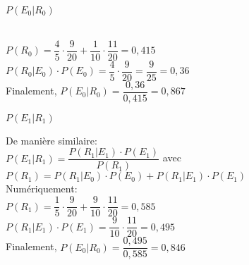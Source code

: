 \begin{exo}
\begin{subexo}{$P(E_0 | R_0)$}
\begin{flushleft}
      \\$P(R_0) = \dfrac{4}{5}\cdot\dfrac{9}{20} +\dfrac{1}{10}\cdot\dfrac{11}{20} = 0,415$
      \\$P(R_0|E_0)\cdot P(E_0) =  \dfrac{4}{5}\cdot \dfrac{9}{20} = \dfrac{9}{25} = 0,36$
      \\ Finalement, $P(E_0|R_0) = \dfrac{0,36}{0,415} = 0,867$
    \end{flushleft}
  \end{subexo}
  \begin{subexo}{$P(E_1 | R_1)$}
    \begin{flushleft}
      De manière similaire:
      \\$P(E_1|R_1) = \dfrac{P(R_1|E_1)\cdot P(E_1)}{P(R_1)}$ avec $P(R_1) = P(R_1 | E_0) \cdot P(E_0) + P(R_1 | E_1)\cdot P(E_1)$
      \\Numériquement:
      \\$P(R_1) = \dfrac{1}{5}\cdot\dfrac{9}{20} +\dfrac{9}{10}\cdot\dfrac{11}{20} = 0,585$
      \\$P(R_1|E_1)\cdot P(E_1) =  \dfrac{9}{10}\cdot \dfrac{11}{20} = 0,495$
      \\ Finalement, $P(E_0|R_0) = \dfrac{0,495}{0,585} = 0,846$
    \end{flushleft}
  \end{subexo}
\end{exo}
